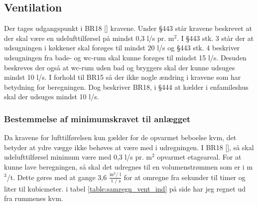 \subsection{Ventilation} \label{sub:ventilation}
Der tages udgangspunkt i BR18 [\cite{BR18:Online}] kravene.
Under \S443 står kravene beskrevet at der skal være en udelufttilførsel på mindst 0,3 l/s pr. m$^2$.
I \S443 stk. 3 står der at udsugningen i køkkener skal forøges til mindst 20 l/s og \S443 stk. 4 beskriver udsugningen fra bade- og wc-rum skal kunne forøges til mindst 15 l/s.
Desuden beskreves der også at wc-rum uden bad og bryggers skal der kunne udsuges mindst 10 l/s. 
I forhold til BR15 så der ikke nogle ændring i kravene som har betydning for beregningen.
Dog beskriver BR18, i \S444 at kælder i enfamileshus skal der udsuges mindst 10 l/s.

\subsubsection{Bestemmelse af minimumskravet til anlægget} \label{subsub:minimumkrav_ventilation}
Da kravene for lufttilførelsen kun gælder for de opvarmet beboelse kvm,
det betyder at ydre vægge ikke behøves at være med i udregningen.
I BR18 [\cite{BR18:Online}], 
så skal udelufttilførsel minimum være med 0,3 l/s pr. m$^2$ opvarmet etageareal.
For at kunne lave beregningen, så skal det udregnes til en volumenstrømmen som er i m$^3$/t. 
Dette gøres med at gange 3,6 $\frac{ \text{m}^3 \text{/ l} }{\text{ t / s} }$ for at omregne fra sekunder til timer og liter til kubicmeter.
i tabel \ref{table:samregn_vent_ind} på side \pageref{table:samregn_vent_ind} har jeg regnet ud fra rummenes kvm.

